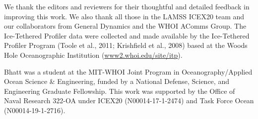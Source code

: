 \documentclass[preprint,TurnOnLineNumbers]{JASA}
\begin{document}


\FloatBarrier
\clearpage
\begin{acknowledgments}
We thank the editors and reviewers for their thoughtful and detailed feedback in improving this work.
We also thank all those in the LAMSS ICEX20 team and our collaborators from General Dynamics and the WHOI AComms Group.
The Ice-Tethered Profiler data were collected and made available by the Ice-Tethered Profiler Program (Toole et al., 2011; Krishfield et al., 2008) based at the Woods Hole Oceanographic Institution (\href{https://www2.whoi.edu/site/itp/}{www2.whoi.edu/site/itp}).

Bhatt was a student at the MIT-WHOI Joint Program in Oceanography/Applied Ocean Science \& Engineering, funded by a National Defense, Science, and Engineering Graduate Fellowship.
This work was supported by the Office of Naval Research 322-OA under ICEX20 (N00014-17-1-2474) and Task Force Ocean (N00014-19-1-2716).
\end{acknowledgments}


\end{document}
